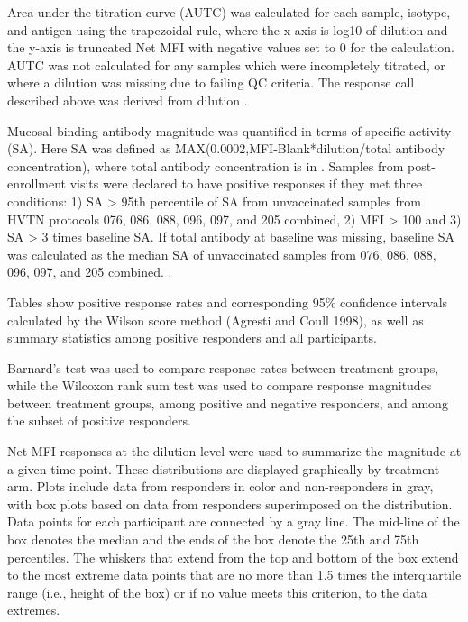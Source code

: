 \documentclass[12pt]{article}
\begin{document}
Area under the titration curve (AUTC) was calculated for each sample,
isotype, and antigen using the trapezoidal rule, where the x-axis is
log10 of dilution and the y-axis is truncated Net MFI with negative
values set to 0 for the calculation. AUTC was not calculated for any
samples which were incompletely titrated, or where a dilution was
missing due to failing QC criteria. The response call described above
was derived from dilution .

Mucosal binding antibody magnitude was quantified in terms of specific
activity (SA). Here SA was defined as
MAX(0.0002,MFI-Blank*dilution/total antibody concentration), where total
antibody concentration is in . Samples from post-enrollment visits were
declared to have positive responses if they met three conditions: 1) SA
\textgreater{} 95th percentile of SA from unvaccinated samples from HVTN
protocols 076, 086, 088, 096, 097, and 205 combined, 2) MFI
\textgreater{} 100 and 3) SA \textgreater{} 3 times baseline SA. If
total antibody at baseline was missing, baseline SA was calculated as
the median SA of unvaccinated samples from 076, 086, 088, 096, 097, and
205 combined. .

Tables show positive response rates and corresponding 95\% confidence
intervals calculated by the Wilson score method (Agresti and Coull
1998), as well as summary statistics among positive responders and all
participants.

Barnard's test was used to compare response rates between treatment
groups, while the Wilcoxon rank sum test was used to compare response
magnitudes between treatment groups, among positive and negative
responders, and among the subset of positive responders.

Net MFI responses at the dilution level were used to summarize the
magnitude at a given time-point. These distributions are displayed
graphically by treatment arm. Plots include data from responders in
color and non-responders in gray, with box plots based on data from
responders superimposed on the distribution. Data points for each
participant are connected by a gray line. The mid-line of the box
denotes the median and the ends of the box denote the 25th and 75th
percentiles. The whiskers that extend from the top and bottom of the box
extend to the most extreme data points that are no more than 1.5 times
the interquartile range (i.e., height of the box) or if no value meets
this criterion, to the data extremes.
\end{document}
